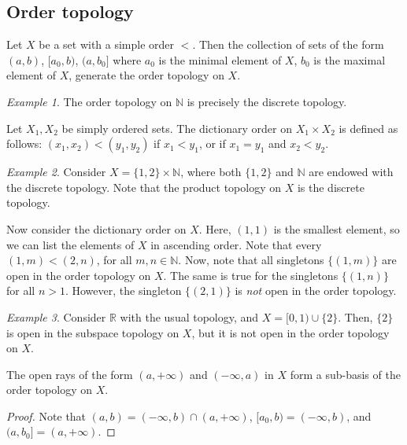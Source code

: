 \documentclass[11pt]{article}
\newcommand{\R}{\mathbb{R}}
\newcommand{\N}{\mathbb{N}}
\theoremstyle{definition}
\theoremstyle{remark}
\newtheorem*{example}{Example}
\numberwithin{equation}{section}
\begin{document}
    \subsection{Order topology}

    \begin{definition}
        Let $X$ be a set with a simple order $<$. Then the collection of sets of the
        form $(a, b)$, $[a_0, b)$, $(a, b_0]$ where $a_0$ is the minimal element of
        $X$, $b_0$ is the maximal element of $X$, generate the order topology on
        $X$.
    \end{definition}
    \begin{example}
        The order topology on $\N$ is precisely the discrete topology.
    \end{example}

    \begin{definition}
        Let $X_1, X_2$ be simply ordered sets. The dictionary order on $X_1 \times
        X_2$ is defined as follows: $(x_1, x_2) < (y_1, y_2)$ if $x_1 < y_1$, or if
        $x_1 = y_1$ and $x_2 < y_2$.
    \end{definition}
    
    \begin{example}
        Consider $X = \{1, 2\} \times \N$, where both $\{1, 2\}$ and $\N$ are endowed
        with the discrete topology. Note that the product topology on $X$ is the
        discrete topology.

        Now consider the dictionary order on $X$. Here, $(1, 1)$ is the smallest
        element, so we can list the elements of $X$ in ascending order. Note that
        every $(1, m) < (2, n)$, for all $m, n \in \N$. Now, note that all singletons
        $\{(1, m)\}$ are open in the order topology on $X$. The same is true for the
        singletons $\{(1, n)\}$ for all $n > 1$. However, the singleton $\{(2, 1)\}$
        is \emph{not} open in the order topology.
    \end{example}

    \begin{example}
        Consider $\R$ with the usual topology, and $X = [0, 1) \cup \{2\}$. Then,
        $\{2\}$ is open in the subspace topology on $X$, but it is not open in the
        order topology on $X$.
    \end{example}

    \begin{lemma}
        The open rays of the form $(a, +\infty)$ and $(-\infty, a)$ in $X$ form a
        sub-basis of the order topology on $X$.
    \end{lemma}
    \begin{proof}
        Note that $(a, b) = (-\infty, b) \cap (a, +\infty)$, $[a_0, b) = (-\infty,
        b)$, and $(a, b_0] = (a, +\infty)$.
    \end{proof}
\end{document}

